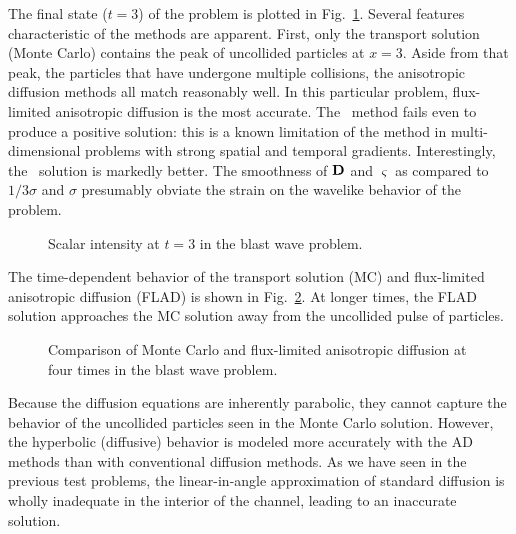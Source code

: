 The final state ($t=3$) of the problem is plotted in Fig.~\ref{fig:tdBlastwave}.
Several features characteristic of the methods are apparent. First, only the
transport solution (Monte Carlo) contains the peak of uncollided particles at
$x=3$. Aside from that peak, the particles that have undergone
multiple collisions, the anisotropic diffusion methods all match reasonably
well. In this particular problem, flux-limited anisotropic diffusion is the most
accurate. The \Pone\ method fails even to produce a positive solution: this is a
known limitation of the method in multi-dimensional problems with strong spatial
and temporal gradients. Interestingly, the \APone\ solution is markedly better.
The smoothness of $\mathbf{D}$ and $\varsigma$ as compared to $1/3\sigma$ and
$\sigma$ presumably obviate the strain on the wavelike behavior of the problem.

\begin{figure}[htb]
  \centering\small

  \caption{Scalar intensity at $t=3$ in the blast wave problem.}
  \label{fig:tdBlastwave}
\end{figure}

The time-dependent behavior of the transport solution (MC) and flux-limited
anisotropic diffusion (FLAD) is shown in Fig.~\ref{fig:tdBlastwaveAll}. At longer
times, the FLAD solution approaches the MC solution away from the uncollided
pulse of particles.

\begin{figure}[htb]
  \centering\small
    \hspace{-.15in}%
    

  \caption{Comparison of Monte Carlo and flux-limited anisotropic diffusion at
  four times in the blast wave problem.}
  \label{fig:tdBlastwaveAll}
\end{figure}

Because the diffusion equations are inherently parabolic, they cannot capture
the behavior of the uncollided particles seen in the Monte Carlo solution.
However, the hyperbolic (diffusive) behavior is modeled more accurately with
the AD methods than with conventional diffusion methods. As we have seen in the
previous test problems, the linear-in-angle approximation of standard diffusion
is wholly inadequate in the interior of the channel, leading to an inaccurate
solution.

